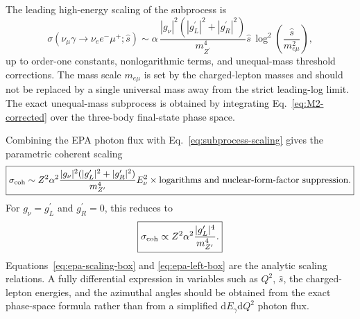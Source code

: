 \documentclass[
  aps,
  prl,
  twocolumn,
  superscriptaddress,
  amsmath, amssymb,
  floatfix, nofootinbib,
  longbibliography,
]{revtex4-2}
\newcommand{\Zp}{Z^{\prime}}
\newcommand{\mZp}{m_{\Zp}}
\newcommand{\Enu}{E_\nu}
\newcommand{\gL}{{g^{\prime}_L}}
\newcommand{\gR}{{g^{\prime}_R}}
\newcommand{\gnu}{{g_\nu}}
\newcommand{\dd}{\mathrm{d}}
\begin{document}
The leading high-energy scaling of the subprocess is
\begin{equation}
  \sigma(\nu_\mu\gamma\to\nu_e e^-\mu^+;\hat s)
  \sim
  \alpha\,
  \frac{|\gnu|^2(|\gL|^2+|\gR|^2)}{\mZp^4}
  \hat s\,
  \log^2\!\left(\frac{\hat s}{m_{e\mu}^2}\right),
\label{eq:subprocess-scaling}
\end{equation}
up to order-one constants, nonlogarithmic terms, and unequal-mass
threshold corrections.  The mass scale $m_{e\mu}$ is set by the
charged-lepton masses and should not be replaced by a single universal
mass away from the strict leading-log limit.  The exact unequal-mass
subprocess is obtained by integrating Eq.~\eqref{eq:M2-corrected} over
the three-body final-state phase space.

Combining the EPA photon flux with Eq.~\eqref{eq:subprocess-scaling}
gives the parametric coherent scaling
\begin{equation}
  \boxed{
  \sigma_{\rm coh}
  \sim
  Z^2\alpha^2
  \frac{|\gnu|^2(|\gL|^2+|\gR|^2)}{\mZp^4}
  \Enu^2
  \times
  \text{logarithms and nuclear-form-factor suppression}.
  }
\label{eq:epa-scaling-box}
\end{equation}
For $\gnu=\gL$ and $\gR=0$, this reduces to
\begin{equation}
  \boxed{
  \sigma_{\rm coh}
  \propto
  Z^2\alpha^2
  \frac{|\gL|^4}{\mZp^4}.
  }
\label{eq:epa-left-box}
\end{equation}
Equations~\eqref{eq:epa-scaling-box} and \eqref{eq:epa-left-box} are
the analytic scaling relations.  A fully differential expression in
variables such as $Q^2$, $\hat s$, the charged-lepton energies, and the
azimuthal angles should be obtained from the exact phase-space formula
rather than from a simplified $\dd E_\gamma\dd Q^2$ photon flux.
\end{document}

